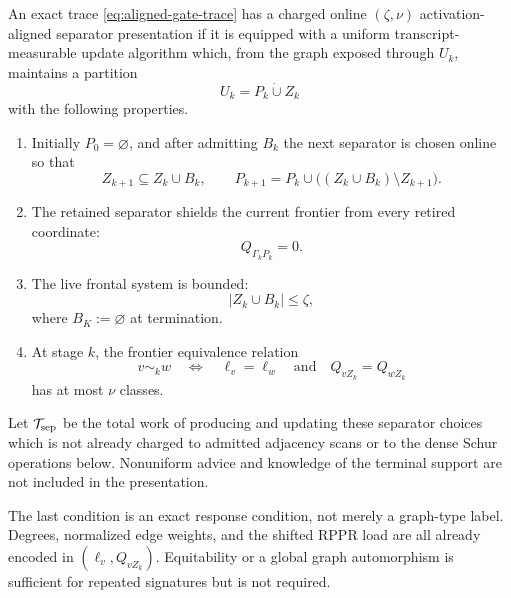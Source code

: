 \begin{definition}
\label{def:activation-aligned-presentation}
An exact trace \cref{eq:aligned-gate-trace} has a charged online
$(\zeta,\nu)$ activation-aligned separator presentation if it is equipped
with a uniform transcript-measurable update algorithm which, from the graph
exposed through $U_k$, maintains a partition
\begin{equation}
 U_k=P_k\mathbin{\dot\cup}Z_k
 \label{eq:processed-separator-partition}
\end{equation}
with the following properties.
\begin{enumerate}[label=(\roman*),leftmargin=*]
 \item Initially $P_0=\varnothing$, and after admitting $B_k$ the next
 separator is chosen online so that
 \begin{equation}
  Z_{k+1}\subseteq Z_k\cup B_k,
  \qquad
  P_{k+1}=P_k\cup\bigl((Z_k\cup B_k)\setminus Z_{k+1}\bigr).
  \label{eq:aligned-retirement}
 \end{equation}
 \item The retained separator shields the current frontier from every
 retired coordinate:
 \begin{equation}
  Q_{\Gamma_kP_k}=0.
  \label{eq:frontier-separation}
 \end{equation}
 \item The live frontal system is bounded:
 \begin{equation}
  |Z_k\cup B_k|\leq\zeta,
  \label{eq:aligned-frontal-size}
 \end{equation}
 where $B_K:=\varnothing$ at termination.
 \item At stage $k$, the frontier equivalence relation
 \begin{equation}
  v\sim_k w
  \quad\Longleftrightarrow\quad
  \ell_v=\ell_w
  \quad\text{and}\quad
  Q_{vZ_k}=Q_{wZ_k}
  \label{eq:boundary-signature}
 \end{equation}
 has at most $\nu$ classes.
\end{enumerate}
Let $\mathcal T_{\rm sep}$ be the total work of producing and updating these
separator choices which is not already charged to admitted adjacency scans or
to the dense Schur operations below.  Nonuniform advice and knowledge of the
terminal support are not included in the presentation.
\end{definition}

The last condition is an exact response condition, not merely a graph-type
label.  Degrees, normalized edge weights, and the shifted RPPR load are all
already encoded in $(\ell_v,Q_{vZ_k})$.  Equitability or a global graph
automorphism is sufficient for repeated signatures but is not required.

